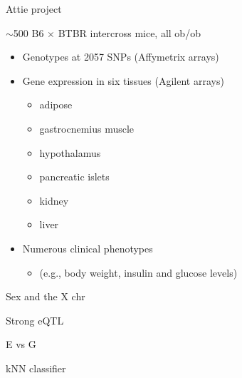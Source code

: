 \documentclass[12pt,t]{beamer}
\begin{document}
\begin{frame}[c]{Attie project}


{\hilit
$\sim$500 B6 $\times$ BTBR intercross mice, all ob/ob }

\vspace{6pt}

\begin{itemize}
\itemsep12pt
\item Genotypes at 2057 SNPs (Affymetrix arrays)

\item Gene expression in six tissues (Agilent arrays)

  \begin{itemize}
    \item adipose
    \item gastrocnemius muscle
    \item hypothalamus
    \item pancreatic islets
    \item kidney
    \item liver
  \end{itemize}

\item Numerous clinical phenotypes
  \begin{itemize}
    \item[] (e.g., body weight, insulin and glucose levels)
  \end{itemize}

\end{itemize}

\note{}

\end{frame}




\begin{frame}[c]{Sex and the X chr}
\note{}
\end{frame}


\begin{frame}[c]{Strong eQTL}
\note{}
\end{frame}




\begin{frame}[c]{E vs G}
\note{}
\end{frame}


\begin{frame}[c]{kNN classifier}
\note{}
\end{frame}
\end{document}
